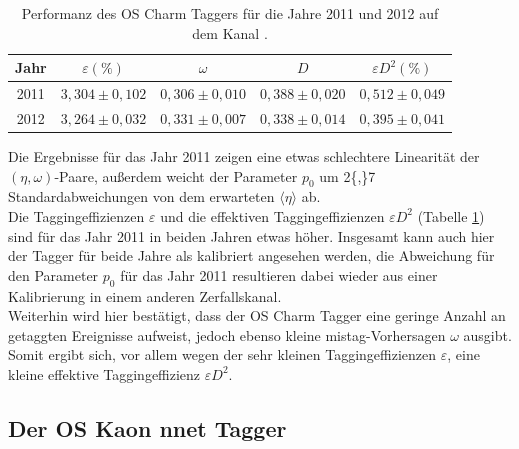 \begin{table}[htbp]
	\centering
	\caption{Performanz des OS Charm Taggers für die Jahre \num{2011} und \num{2012} auf dem Kanal \BdToDpi.}
	\label{tab:performance_OSCharm}
	\begin{tabular}{ccccc}
	\toprule
       Jahr & $\varepsilon(\%)$ & $\omega$ & $D$ & $\varepsilon D^2(\%)$ \\ 
       \midrule
      2011 & $3{,}304\pm0{,}102$ & $0{,}306\pm0{,}010$ & $0{,}388\pm0{,}020$ & $0{,}512\pm0{,}049$\\ 
   2012 & $3{,}264\pm0{,}032$ & $0{,}331\pm0{,}007$ & $0{,}338\pm0{,}014$ & $0{,}395\pm0{,}041$\\ 
   \bottomrule
  \end{tabular}
\end{table}
Die Ergebnisse für das Jahr \num{2011} zeigen eine etwas schlechtere Linearität der $(\eta,\omega)$-Paare, außerdem weicht der Parameter $p_0$ um \num{2{,}7} Standardabweichungen von dem erwarteten $\langle\eta\rangle$ ab.\\
Die Taggingeffizienzen $\varepsilon$ und die effektiven Taggingeffizienzen $\varepsilon D^2$  (Tabelle \ref{tab:performance_OSCharm}) sind für das Jahr \num{2011} in beiden Jahren etwas höher. Insgesamt kann auch hier der Tagger für beide Jahre als kalibriert angesehen werden, die Abweichung für den Parameter $p_0$ für das Jahr \num{2011} resultieren dabei wieder aus einer Kalibrierung in einem anderen Zerfallskanal.\\
Weiterhin wird hier bestätigt, dass der OS Charm Tagger eine geringe Anzahl an getaggten Ereignisse aufweist, jedoch ebenso kleine mistag-Vorhersagen $\omega$ ausgibt. Somit ergibt sich, vor allem wegen der sehr kleinen Taggingeffizienzen $\varepsilon$, eine kleine effektive Taggingeffizienz $\varepsilon D^2$. 

\subsection{Der OS Kaon nnet Tagger}

